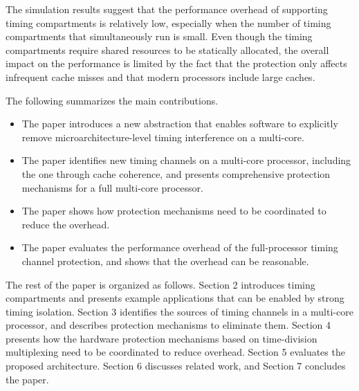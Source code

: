 
The simulation results suggest that the performance overhead of supporting
timing compartments is relatively low, especially when the number of timing
compartments that simultaneously run is small.
Even though
the timing compartments require shared resources to be statically 
allocated, the overall impact on the performance is limited by the fact
that the protection only affects infrequent cache misses and that modern
processors include large caches. 

The following summarizes the main contributions.

\begin{itemize}
\item The paper introduces a new abstraction that enables software to
explicitly remove microarchitecture-level timing interference on a multi-core.
\item The paper identifies new timing channels on a multi-core processor,
including the one through cache coherence, and presents
comprehensive protection mechanisms for a full multi-core processor.
\item The paper shows how protection mechanisms need to be coordinated to
reduce the overhead.%
\item The paper evaluates the performance overhead of the full-processor
timing channel protection, and shows that the overhead can be reasonable.
\end{itemize}

The rest of the paper is organized as follows.
Section 2 introduces timing compartments and 
presents example applications that can be enabled by strong timing isolation.
Section 3 identifies the sources of timing channels in a multi-core processor, and
describes protection mechanisms to eliminate them. 
Section 4 presents how the hardware protection mechanisms based on time-division
multiplexing need to be coordinated to reduce overhead.
Section 5 evaluates the proposed architecture. Section 6 discusses related
work, and Section 7 concludes the paper.
